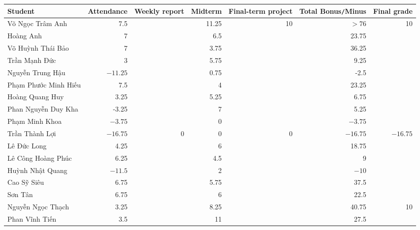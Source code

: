\documentclass{article}
\begin{document}
\begin{table}[H]
    \centering
    \begin{tabular}{|l|r|r|r|r|r|r|}
        \hline
        Student & Attendance & Weekly report & Midterm & Final-term project & Total Bonus{\tt/}Minus & Final grade \\
        \hline
        {\sc Võ Ngọc Trâm Anh} & 7.5 &  & 11.25 & 10 & $> 76$ &  10 \\
        \hline
        {\sc Hoàng Anh} & 7 &  & 6.5 &  & 23.75 &  \\
        \hline
        {\sc Võ Huỳnh Thái Bảo} & 7 &  & 3.75 &  & 36.25 &  \\
        \hline
        {\sc Trần Mạnh Đức} & 3 &  & 5.75 &  & 9.25 &  \\
        \hline
        {\sc Nguyễn Trung Hậu} & $-11.25$ &  & 0.75 &  & -2.5 &  \\
        \hline
        {\sc Phạm Phước Minh Hiếu} & 7.5 &  & 4 &  & 23.25 &  \\
        \hline
        {\sc Hoàng Quang Huy} & 3.25 &  & 5.25 &  & 6.75 &  \\
        \hline
        {\sc Phan Nguyễn Duy Kha} & -3.25 &  & 7 &  & 5.25 &  \\
        \hline
        {\sc Phạm Minh Khoa} & $-3.75$ &  & 0 &  & $-3.75$ &  \\
        \hline
        {\sc Trần Thành Lợi} & $-16.75$ & 0 & 0 & 0 & $-16.75$ & $-16.75$ \\
        \hline
        {\sc Lê Đức Long} & 4.25 &  & 6 &  & 18.75 &  \\
        \hline
        {\sc Lê Công Hoàng Phúc} & 6.25 & & 4.5 &  & 9 &  \\
        \hline
        {\sc Huỳnh Nhật Quang} & $-11.5$ &  & 2 &  & $-10$ &  \\
        \hline
        {\sc Cao Sỹ Siêu} & 6.75 &  & 5.75 &  & 37.5 &  \\
        \hline
        {\sc Sơn Tân} & 6.75 &  & 6 &  & 22.5 &  \\
        \hline
        {\sc Nguyễn Ngọc Thạch} & 3.25 &  & 8.25 &  & 40.75 & 10 \\
        \hline
        {\sc Phan Vĩnh Tiến} & 3.5 &  & 11 &  & 27.5 &  \\
        \hline
    \end{tabular}
\end{table}

\end{document}
